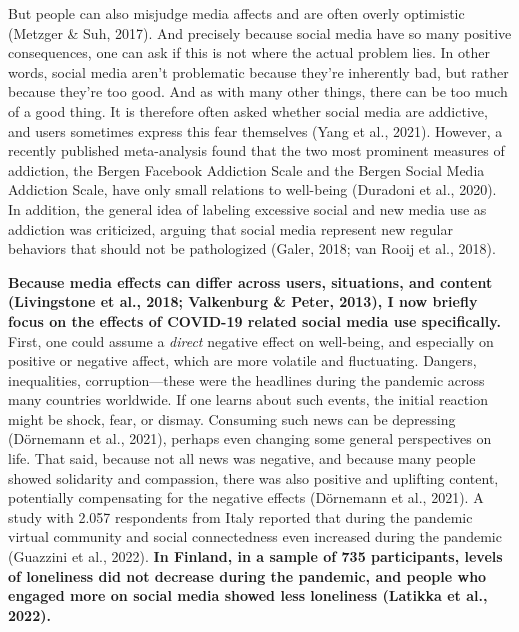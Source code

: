 \documentclass[
  man,mask]{apa7}
\begin{document}
But people can also misjudge media affects and are often overly optimistic (Metzger \& Suh, 2017).
And precisely because social media have so many positive consequences, one can ask if this is not where the actual problem lies.
In other words, social media aren't problematic because they're inherently bad, but rather because they're too good.
And as with many other things, there can be too much of a good thing.
It is therefore often asked whether social media are addictive, and users sometimes express this fear themselves (Yang et al., 2021).
However, a recently published meta-analysis found that the two most prominent measures of addiction, the Bergen Facebook Addiction Scale and the Bergen Social Media Addiction Scale, have only small relations to well-being (Duradoni et al., 2020).
In addition, the general idea of labeling excessive social and new media use as addiction was criticized, arguing that social media represent new regular behaviors that should not be pathologized (Galer, 2018; van Rooij et al., 2018).

\textbf{Because media effects can differ across users, situations, and content (Livingstone et al., 2018; Valkenburg \& Peter, 2013), I now briefly focus on the effects of COVID-19 related social media use specifically.}
First, one could assume a \emph{direct} negative effect on well-being, and especially on positive or negative affect, which are more volatile and fluctuating.
Dangers, inequalities, corruption---these were the headlines during the pandemic across many countries worldwide.
If one learns about such events, the initial reaction might be shock, fear, or dismay.
Consuming such news can be depressing (Dörnemann et al., 2021), perhaps even changing some general perspectives on life.
That said, because not all news was negative, and because many people showed solidarity and compassion, there was also positive and uplifting content, potentially compensating for the negative effects (Dörnemann et al., 2021).
A study with 2.057 respondents from Italy reported that during the pandemic virtual community and social connectedness even increased during the pandemic (Guazzini et al., 2022).
\textbf{In Finland, in a sample of 735 participants, levels of loneliness did not decrease during the pandemic, and people who engaged more on social media showed less loneliness (Latikka et al., 2022).}
\end{document}
